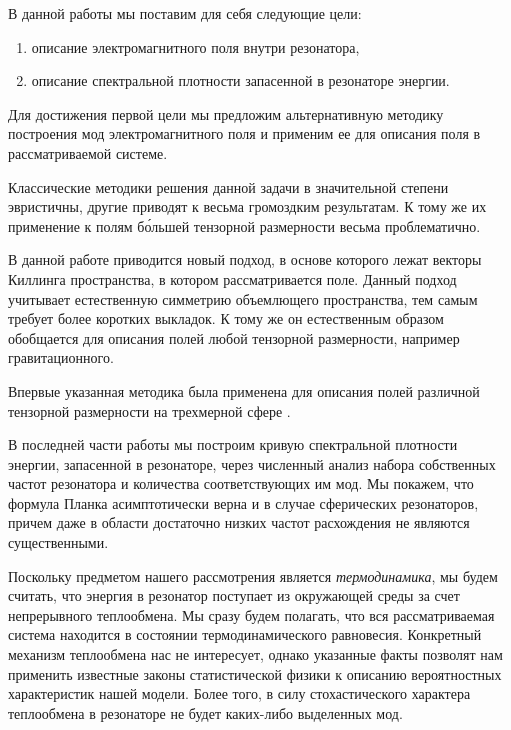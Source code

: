     В данной работы мы поставим для себя следующие цели:
    \begin{enumerate}[nosep,labelindent=0pt]
        \item описание электромагнитного поля внутри резонатора,
        \item описание спектральной плотности запасенной в резонаторе энергии.
    \end{enumerate}

    Для достижения первой цели мы предложим альтернативную методику построения мод электромагнитного поля и применим ее для описания поля в рассматриваемой системе.

    Классические методики решения данной задачи в значительной степени эвристичны, другие приводят к весьма громоздким результатам. К тому же их применение к полям б\'{о}льшей тензорной размерности весьма проблематично. \cite{burlankov_tmf}

    В данной работе приводится новый подход, в основе которого лежат векторы Киллинга пространства, в котором рассматривается поле. Данный подход учитывает естественную симметрию объемлющего пространства, тем самым требует более коротких выкладок. К тому же он естественным образом обобщается для описания полей любой тензорной размерности, например гравитационного. \cite{burlankov_tmf}

    Впервые указанная методика была применена для описания полей различной тензорной размерности на трехмерной сфере \cite{burlankov_tmf}.

    В последней части работы мы построим кривую спектральной плотности энергии, запасенной в резонаторе, через численный анализ набора собственных частот резонатора и количества соответствующих им мод. Мы покажем, что формула Планка асимптотически верна и в случае сферических резонаторов, причем даже в области достаточно низких частот расхождения не являются существенными.

    Поскольку предметом нашего рассмотрения является \textit{термодинамика}, мы будем считать, что энергия в резонатор поступает из окружающей среды за счет непрерывного теплообмена. Мы сразу будем полагать, что вся рассматриваемая система находится в состоянии термодинамического равновесия. Конкретный механизм теплообмена нас не интересует, однако указанные факты позволят нам применить известные законы статистической физики к описанию вероятностных характеристик нашей модели. Более того, в силу стохастического характера теплообмена в резонаторе не будет каких-либо выделенных мод.

